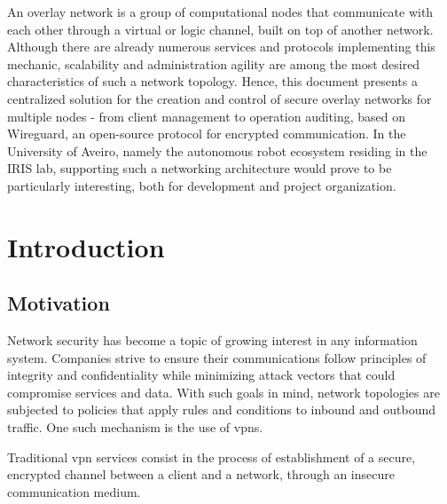 \documentclass[11pt,twoside,a4paper]{report}
\begin{document}
\TitlePage
  \vspace*{55mm}
       {An overlay network is a group of computational nodes that communicate with each other through a virtual or logic channel, built on top of another network. Although there are already numerous services and protocols implementing this mechanic, scalability and administration agility are among the most desired characteristics of such a network topology. Hence, this document presents a centralized solution for the creation and control of secure overlay networks for multiple nodes - from client management to operation auditing, based on Wireguard, an open-source protocol for encrypted communication. In the University of Aveiro, namely the autonomous robot ecosystem residing in the IRIS lab, supporting such a networking architecture would prove to be particularly interesting, both for development and project organization.}
\EndTitlePage
\titlepage\ \endtitlepage %


%
%
\tableofcontents

\cleardoublepage
\listoffigures

\cleardoublepage
\listoftables

\cleardoublepage


\cleardoublepage
{}
\chapter{Introduction}

\section{Motivation}

Network security has become a topic of growing interest in any information system. Companies strive to ensure their communications follow principles of integrity and confidentiality while minimizing attack vectors that could compromise services and data. With such goals in mind, network topologies are subjected to policies that apply rules and conditions to inbound and outbound traffic. One such mechanism is the use of \acp{vpn}.

Traditional \ac{vpn} services consist in the process of establishment of a secure, encrypted channel between a client and a network, through an insecure communication medium.
\end{document}

